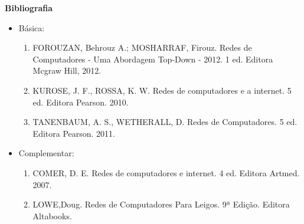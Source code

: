    



\begin{snugshade}\begin{center}\textbf{
    Bibliografia
}\end{center}\end{snugshade}

\begin{itemize} 
  \item Básica:
	\begin{enumerate}
	\item FOROUZAN, Behrouz A.; MOSHARRAF, Firouz. Redes de Computadores - Uma Abordagem Top-Down - 2012. 1 ed. Editora Mcgraw Hill, 2012.
	\item KUROSE, J. F., ROSSA, K. W. Redes de computadores e a internet. 5 ed. Editora Pearson. 2010.
	\item TANENBAUM, A. S., WETHERALL, D. Redes de Computadores. 5 ed. Editora Pearson. 2011. 
	\end{enumerate}
  \item Complementar:
	\begin{enumerate} 
	\item COMER, D. E. Redes de computadores e internet. 4 ed. Editora Artmed. 2007.
	\item LOWE,Doug. Redes de Computadores Para Leigos. 9ª Edição. Editora Altabooks.
	\end{enumerate}
\end{itemize}
